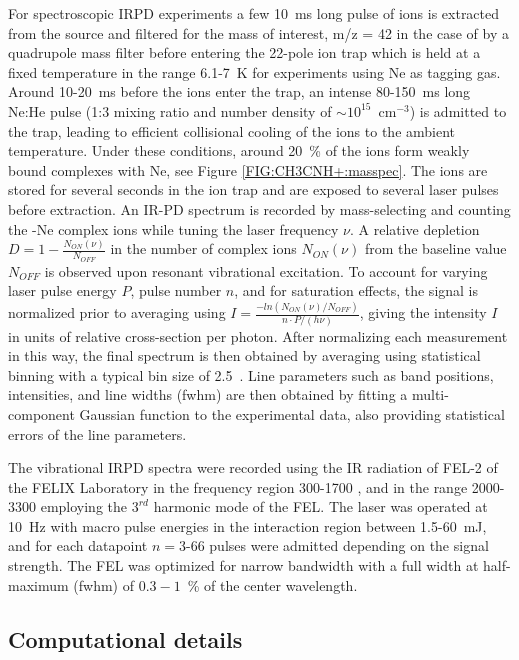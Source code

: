 For spectroscopic IRPD experiments a few 10~ms long pulse of ions is extracted from the source and filtered for the mass of interest, m/z = 42 in the case of \pa by a quadrupole mass filter before entering the 22-pole ion trap which is held at a fixed temperature in the range 6.1-7~K for experiments using Ne as tagging gas. Around 10-20~ms before the ions enter the trap, an intense 80-150~ms long Ne:He pulse (1:3 mixing ratio and number density of $\sim 10^{15}$~cm$^{-3}$) is admitted to the trap, leading to efficient collisional cooling of the ions to the ambient temperature. Under these conditions, { around 20~\% of the \pa ions form weakly bound complexes with Ne, see Figure \ref{FIG:CH3CNH+:masspec}.} The ions are stored for several seconds in the ion trap and are exposed to several laser pulses before extraction. An IR-PD spectrum is recorded by mass-selecting and counting the \pan-Ne complex ions while tuning the laser frequency $\nu$. A relative depletion $D=1-\frac{N_{ON}(\nu)}{N_{OFF}}$ in the number of complex ions $N_{ON}(\nu)$ from the baseline value $N_{OFF}$ is observed upon resonant vibrational excitation. To account for varying laser pulse energy $P$, pulse number $n$, and for saturation effects, the signal is normalized prior to averaging using $I=\frac{- ln(N_{ON}(\nu)/N_{OFF})}{n\cdot P/(h\nu)}$, giving the intensity $I$ in units of relative cross-section per photon. 
After normalizing each measurement in this way, the final spectrum is then obtained by averaging using statistical binning with a typical bin size of 2.5~\wn. Line parameters such as band positions, intensities, and line widths (fwhm) are then obtained by fitting a multi-component Gaussian function to the experimental data, also providing statistical errors of the line parameters.


The vibrational IRPD spectra were recorded using the IR radiation of FEL-2 of the FELIX Laboratory in the frequency region 300-1700 \wn, and in the range 2000-3300 \wnn employing the $3^{rd}$ harmonic mode of the FEL. The laser was operated at 10~Hz with macro pulse energies in the interaction region between 1.5-60~mJ, and for each datapoint $n=$3-66 pulses were admitted depending on the signal strength. The FEL was optimized for narrow bandwidth with a full width at half-maximum (fwhm) of $0.3-1$~\% of the center wavelength.\\

\subsection{Computational details} 

